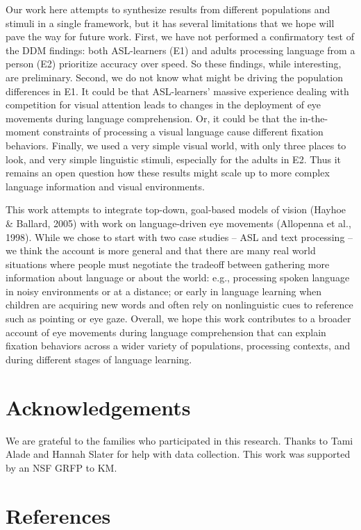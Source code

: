 \documentclass[10pt, letterpaper]{article}
\begin{document}
Our work here attempts to synthesize results from different populations
and stimuli in a single framework, but it has several limitations that
we hope will pave the way for future work. First, we have not performed
a confirmatory test of the DDM findings: both ASL-learners (E1) and
adults processing language from a person (E2) prioritize accuracy over
speed. So these findings, while interesting, are preliminary. Second, we
do not know what might be driving the population differences in E1. It
could be that ASL-learners' massive experience dealing with competition
for visual attention leads to changes in the deployment of eye movements
during language comprehension. Or, it could be that the in-the-moment
constraints of processing a visual language cause different fixation
behaviors. Finally, we used a very simple visual world, with only three
places to look, and very simple linguistic stimuli, especially for the
adults in E2. Thus it remains an open question how these results might
scale up to more complex language information and visual environments.

This work attempts to integrate top-down, goal-based models of vision
(Hayhoe \& Ballard, 2005) with work on language-driven eye movements
(Allopenna et al., 1998). While we chose to start with two case studies
-- ASL and text processing -- we think the account is more general and
that there are many real world situations where people must negotiate
the tradeoff between gathering more information about language or about
the world: e.g., processing spoken language in noisy environments or at
a distance; or early in language learning when children are acquiring
new words and often rely on nonlinguistic cues to reference such as
pointing or eye gaze. Overall, we hope this work contributes to a
broader account of eye movements during language comprehension that can
explain fixation behaviors across a wider variety of populations,
processing contexts, and during different stages of language learning.

\section{Acknowledgements}\label{acknowledgements}

We are grateful to the families who participated in this research.
Thanks to Tami Alade and Hannah Slater for help with data collection.
This work was supported by an NSF GRFP to KM.

\section{References}\label{references}
\end{document}
